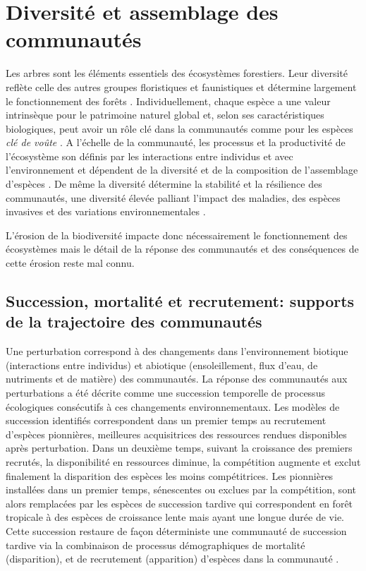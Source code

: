 \documentclass[
  11pt,
  french,
  A4paper,
  extrafontsizes,onecolumn,openright
  ]{memoir}
\begin{document}
\section{Diversité et assemblage des
communautés}\label{diversite-et-assemblage-des-communautes}

Les arbres sont les éléments essentiels des écosystèmes forestiers. Leur
diversité reflète celle des autres groupes floristiques et faunistiques
et détermine largement le fonctionnement des forêts
\autocite{Guitet2017}. Individuellement, chaque espèce a une valeur
intrinsèque pour le patrimoine naturel global et, selon ses
caractéristiques biologiques, peut avoir un rôle clé dans la communautés
comme pour les espèces \emph{clé de voûte}
\autocites{Jones1994}{Power1996}{Gardner2007}. A l'échelle de la
communauté, les processus et la productivité de l'écosystème son définis
par les interactions entre individus et avec l'environnement et
dépendent de la diversité et de la composition de l'assemblage d'espèces
\autocite{Begon2006}. De même la diversité détermine la stabilité et la
résilience des communautés, une diversité élevée palliant l'impact des
maladies, des espèces invasives et des variations environnementales
\autocite{Elmqvist2003}.

L'érosion de la biodiversité impacte donc nécessairement le
fonctionnement des écosystèmes mais le détail de la réponse des
communautés et des conséquences de cette érosion reste mal connu.

\subsection{Succession, mortalité et recrutement: supports de la
trajectoire des
communautés}\label{succession-mortalite-et-recrutement-supports-de-la-trajectoire-des-communautes}

Une perturbation correspond à des changements dans l'environnement
biotique (interactions entre individus) et abiotique (ensoleillement,
flux d'eau, de nutriments et de matière) des communautés. La réponse des
communautés aux perturbations a été décrite comme une succession
temporelle de processus écologiques consécutifs à ces changements
environnementaux. Les modèles de succession identifiés correspondent
dans un premier temps au recrutement d'espèces pionnières, meilleures
acquisitrices des ressources rendues disponibles après perturbation.
Dans un deuxième temps, suivant la croissance des premiers recrutés, la
disponibilité en ressources diminue, la compétition augmente et exclut
finalement la disparition des espèces les moins compétitrices. Les
pionnières installées dans un premier temps, sénescentes ou exclues par
la compétition, sont alors remplacées par les espèces de succession
tardive qui correspondent en forêt tropicale à des espèces de croissance
lente mais ayant une longue durée de vie. Cette succession restaure de
façon déterministe une communauté de succession tardive via la
combinaison de processus démographiques de mortalité (disparition), et
de recrutement (apparition) d'espèces dans la communauté
\autocite{Denslow2000}.
\end{document}
